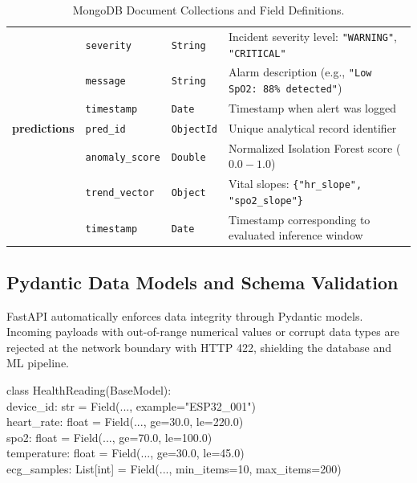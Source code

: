 \documentclass[12pt]{article}
\newlength{\wA}
\newlength{\wB}
\newlength{\wC}
\newlength{\wD}
\begin{document}
\begin{table}[htbp]
\begin{tabular}{|B{\wA}|L{\wB}|L{\wC}|L{\wD}|}
    & \texttt{severity} & \texttt{String} & Incident severity level: \texttt{"WARNING"}, \texttt{"CRITICAL"} \\
    & \texttt{message} & \texttt{String} & Alarm description (e.g., \texttt{"Low SpO2: 88\% detected"}) \\
    & \texttt{timestamp} & \texttt{Date} & Timestamp when alert was logged \\
    \hline
    \textbf{predictions} & \texttt{pred\_id} & \texttt{ObjectId} & Unique analytical record identifier \\
    & \texttt{anomaly\_score} & \texttt{Double} & Normalized Isolation Forest score ($0.0 - 1.0$) \\
    & \texttt{trend\_vector} & \texttt{Object} & Vital slopes: \texttt{\{"hr\_slope", "spo2\_slope"\}} \\
    & \texttt{timestamp} & \texttt{Date} & Timestamp corresponding to evaluated inference window \\
    \hline
\end{tabular}
\caption{MongoDB Document Collections and Field Definitions.}
\label{tab:mongo_schema}
\end{table}

\subsection{Pydantic Data Models and Schema Validation}
FastAPI automatically enforces data integrity through Pydantic models. Incoming payloads with out-of-range numerical values or corrupt data types are rejected at the network boundary with HTTP 422, shielding the database and ML pipeline.

\begin{tcolorbox}[colback=black!3, colframe=black!60, arc=2pt, boxrule=0.6pt, left=5pt, right=5pt, top=2pt, bottom=2pt]
\footnotesize\ttfamily
class HealthReading(BaseModel):\\
\quad device\_id: str = Field(..., example="ESP32\_001")\\
\quad heart\_rate: float = Field(..., ge=30.0, le=220.0)\\
\quad spo2: float = Field(..., ge=70.0, le=100.0)\\
\quad temperature: float = Field(..., ge=30.0, le=45.0)\\
\quad ecg\_samples: List[int] = Field(..., min\_items=10, max\_items=200)
\end{tcolorbox}
\clearpage

\end{document}
